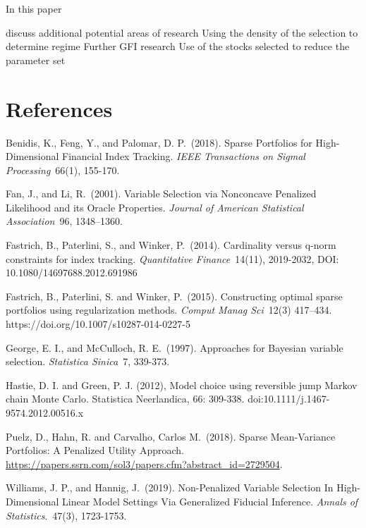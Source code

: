 \documentclass[a4paper, 12pt]{article}
\theoremstyle{plain}
\theoremstyle{definition}
\theoremstyle{remark}
\begin{document}
In this paper 

{\color{red} discuss additional potential areas of research}
Using the density of the selection to determine regime
Further GFI research
Use of the stocks selected to reduce the parameter set

\section*{References}

\begin{description}

\item{} Benidis, K., Feng, Y., and Palomar, D. P.~(2018). Sparse Portfolios for High-Dimensional Financial Index Tracking. \emph{IEEE Transactions on Sigmal Processing}~66(1), 155-170.

\item{} Fan, J., and Li, R.~(2001). Variable Selection via Nonconcave Penalized Likelihood and its
Oracle Properties. \emph{Journal of American Statistical Association}~96, 1348–1360.

\item{} Fastrich, B., Paterlini, S., and Winker, P.~(2014). Cardinality versus q-norm constraints for index tracking. \emph{Quantitative Finance}~14(11), 2019-2032, DOI: 10.1080/14697688.2012.691986

\item{} Fastrich, B., Paterlini, S. and Winker, P.~(2015). Constructing optimal sparse portfolios using regularization methods. \emph{Comput Manag Sci}~12(3) 417–434. https://doi.org/10.1007/s10287-014-0227-5

\item{} George, E. I., and McCulloch, R. E.~(1997). Approaches for Bayesian variable selection. \emph{Statistica Sinica}~7, 339-373.

\item{} Hastie, D. I. and Green, P. J. (2012), Model choice using reversible jump Markov chain Monte Carlo. Statistica Neerlandica, 66: 309-338. doi:10.1111/j.1467-9574.2012.00516.x

\item{} Puelz, D., Hahn, R. and Carvalho, Carlos M.~(2018). Sparse Mean-Variance Portfolios: A Penalized Utility Approach. \url{https://papers.ssrn.com/sol3/papers.cfm?abstract_id=2729504}.

\item{} Williams, J. P., and Hannig, J.~(2019). Non-Penalized Variable Selection In High-Dimensional Linear Model Settings Via Generalized Fiducial Inference. \emph{Annals of Statistics}.~47(3), 1723-1753. 

\end{description}
\end{document}
